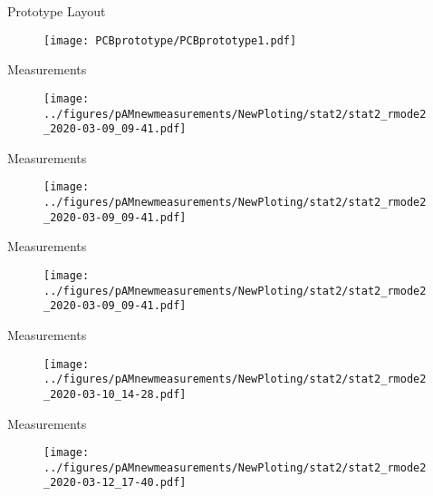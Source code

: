 \documentclass[t]{beamer}
\begin{document}
\begin{frame}[c]{Prototype Layout}
	\begin{figure}
	\texttt{[image: PCBprototype/PCBprototype1.pdf]}
\end{figure}
\end{frame}

\begin{frame}[c]{Measurements}
	\centering
	\begin{figure}
		\centering
		\texttt{[image: ../figures/pAMnewmeasurements/NewPloting/stat2/stat2\_rmode2\_2020-03-09\_09-41.pdf]}
	\end{figure}
\end{frame}

\begin{frame}[c]{Measurements}
	\begin{figure}
			\texttt{[image: ../figures/pAMnewmeasurements/NewPloting/stat2/stat2\_rmode2\_2020-03-09\_09-41.pdf]}
	\end{figure}
\end{frame}
\begin{frame}[c]{Measurements}
	\begin{figure}
		\texttt{[image: ../figures/pAMnewmeasurements/NewPloting/stat2/stat2\_rmode2\_2020-03-09\_09-41.pdf]}
	\end{figure}
\end{frame}
\begin{frame}[c]{Measurements}
\begin{figure} 
	\centering
	\texttt{[image: ../figures/pAMnewmeasurements/NewPloting/stat2/stat2\_rmode2\_2020-03-10\_14-28.pdf]}
\end{figure}
\end{frame}
\begin{frame}[c]{Measurements}
\begin{figure} 
	\centering
	\texttt{[image: ../figures/pAMnewmeasurements/NewPloting/stat2/stat2\_rmode2\_2020-03-12\_17-40.pdf]}
\end{figure}
\end{frame}
\end{document}
